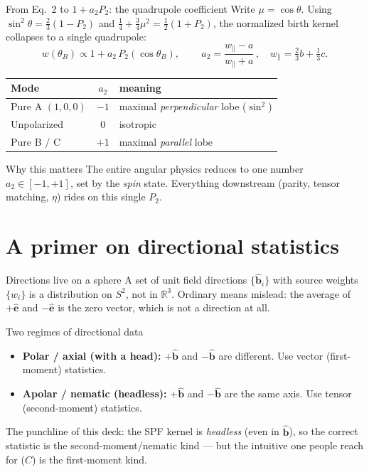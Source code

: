 \documentclass[aspectratio=169]{beamer}
\newcommand{\bb}{\hat{\bm b}}
\newcommand{\be}{\hat{\bm e}}
\newcommand{\wpar}{w_\parallel}
\begin{document}
\begin{frame}[t]{From Eq.~2 to $1+a_2P_2$: the quadrupole coefficient}
Write $\mu=\cos\theta$. Using $\sin^2\theta=\tfrac23(1-P_2)$ and $\tfrac14+\tfrac34\mu^2=\tfrac12(1+P_2)$, the normalized birth kernel collapses to a single quadrupole:
\[
w(\theta_B)\propto 1 + a_2\,P_2(\cos\theta_B),
\qquad
\boxed{\,a_2 = \frac{\wpar - a}{\wpar + a}\,},
\quad \wpar=\tfrac23 b+\tfrac13 c .
\]
\renewcommand{\arraystretch}{1.1}
\begin{center}
\begin{tabular}{lcl}
\toprule
Mode & $a_2$ & meaning \\
\midrule
Pure A $(1,0,0)$ & $-1$ & maximal \emph{perpendicular} lobe ($\sin^2$) \\
Unpolarized & $0$ & isotropic \\
Pure B / C & $+1$ & maximal \emph{parallel} lobe \\
\bottomrule
\end{tabular}
\end{center}
\begin{block}{Why this matters}
The entire angular physics reduces to one number $a_2\in[-1,+1]$, set by the \emph{spin} state. Everything downstream (parity, tensor matching, $\eta$) rides on this single $P_2$.
\end{block}
\end{frame}

\section{A primer on directional statistics}

\begin{frame}[t]{Directions live on a sphere}
A set of unit field directions $\{\bb_i\}$ with source weights $\{w_i\}$ is a distribution on $S^2$, not in $\mathbb R^3$. Ordinary means mislead: the average of $+\be$ and $-\be$ is the zero vector, which is not a direction at all.
\vspace{0.4em}
\begin{block}{Two regimes of directional data}
\begin{itemize}
  \item \textbf{Polar / axial (with a head):} $+\bb$ and $-\bb$ are different. Use vector (first-moment) statistics.
  \item \textbf{Apolar / nematic (headless):} $+\bb$ and $-\bb$ are the same axis. Use tensor (second-moment) statistics.
\end{itemize}
\end{block}
\alert{The punchline of this deck}: the SPF kernel is \emph{headless} (even in $\bb$), so the correct statistic is the second-moment/nematic kind --- but the intuitive one people reach for ($C$) is the first-moment kind.
\end{frame}
\end{document}
